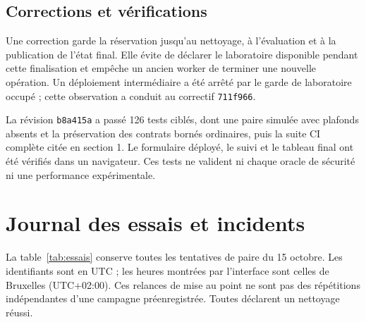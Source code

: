 \documentclass[11pt,a4paper]{article}
\newcommand{\code}[1]{\nolinkurl{#1}}
\begin{document}
\subsection{Corrections et vérifications}
Une correction garde la réservation jusqu'au nettoyage, à l'évaluation et à la
publication de l'état final. Elle évite de déclarer le laboratoire disponible
pendant cette finalisation et empêche un ancien worker de terminer une nouvelle
opération. Un déploiement intermédiaire a été arrêté par le garde de laboratoire
occupé ; cette observation a conduit au correctif \code{711f966}.

La révision \code{b8a415a} a passé 126 tests ciblés, dont une paire simulée avec
plafonds absents et la préservation des contrats bornés ordinaires, puis la suite
CI complète citée en section 1. Le formulaire déployé, le suivi et le tableau
final ont été vérifiés dans un navigateur. Ces tests ne valident ni chaque
oracle de sécurité ni une performance expérimentale.

\clearpage
\section{Journal des essais et incidents}
La table~\ref{tab:essais} conserve toutes les tentatives de paire du 15 octobre.
Les identifiants sont en UTC ; les heures montrées par l'interface sont celles
de Bruxelles (UTC+02:00). Ces relances de mise au point ne sont pas des répétitions
indépendantes d'une campagne préenregistrée. Toutes déclarent un nettoyage réussi.
\end{document}
